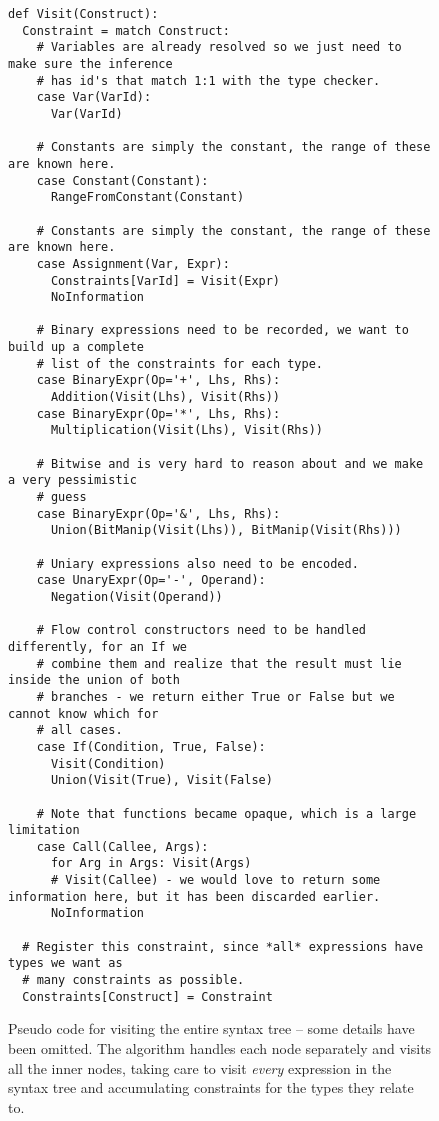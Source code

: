 \begin{figure}[h!]
\begin{verbatim}
def Visit(Construct):
  Constraint = match Construct:
    # Variables are already resolved so we just need to make sure the inference
    # has id's that match 1:1 with the type checker.
    case Var(VarId):
      Var(VarId)

    # Constants are simply the constant, the range of these are known here.
    case Constant(Constant):
      RangeFromConstant(Constant)

    # Constants are simply the constant, the range of these are known here.
    case Assignment(Var, Expr):
      Constraints[VarId] = Visit(Expr)
      NoInformation

    # Binary expressions need to be recorded, we want to build up a complete
    # list of the constraints for each type.
    case BinaryExpr(Op='+', Lhs, Rhs):
      Addition(Visit(Lhs), Visit(Rhs))
    case BinaryExpr(Op='*', Lhs, Rhs):
      Multiplication(Visit(Lhs), Visit(Rhs))

    # Bitwise and is very hard to reason about and we make a very pessimistic
    # guess
    case BinaryExpr(Op='&', Lhs, Rhs):
      Union(BitManip(Visit(Lhs)), BitManip(Visit(Rhs)))

    # Uniary expressions also need to be encoded.
    case UnaryExpr(Op='-', Operand):
      Negation(Visit(Operand))

    # Flow control constructors need to be handled differently, for an If we
    # combine them and realize that the result must lie inside the union of both
    # branches - we return either True or False but we cannot know which for
    # all cases.
    case If(Condition, True, False):
      Visit(Condition)
      Union(Visit(True), Visit(False)

    # Note that functions became opaque, which is a large limitation
    case Call(Callee, Args):
      for Arg in Args: Visit(Args)
      # Visit(Callee) - we would love to return some information here, but it has been discarded earlier.
      NoInformation

  # Register this constraint, since *all* expressions have types we want as
  # many constraints as possible.
  Constraints[Construct] = Constraint
\end{verbatim}
  \caption{Pseudo code for visiting the entire syntax tree -- some details have been omitted. The algorithm handles each node separately and visits all the inner nodes, taking care to visit \textit{every} expression in the syntax tree and accumulating constraints for the types they relate to.}
\label{fig:AstWalker}
\end{figure}


